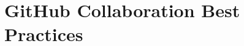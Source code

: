 \documentclass[12pt]{beamer}
\begin{document}
\begin{comment}
\begin{frame}{Git Commit}
  \begin{itemize}
    \item \textbf{Working Directory}: Your local project folder. Files here can be edited freely.
    \item \textbf{Staging Area (Index)}: A holding area for changes you want to include in the next commit.
    \item \textbf{Repository (Local)}: A database where Git permanently stores all versions of your project.
  \end{itemize}
  \vspace{1em}
  \begin{block}{Workflow}
    \texttt{working directory} $\rightarrow$ \texttt{staging area} $\rightarrow$ \texttt{repository}
  \end{block}
  \begin{itemize}
    \item Use \texttt{git add} to move changes to staging
    \item Use \texttt{git commit} to record changes to the repository
  \end{itemize}
\end{frame}

\begin{frame}{Essential Git Commands}
  \begin{itemize}
    \item \texttt{git init}
    \item \texttt{git status}
    \item \texttt{git add}
    \item \texttt{git commit}
    \item \texttt{git log}
    \item \texttt{git diff}
  \end{itemize}
\end{frame}
\end{comment}

\section{GitHub Collaboration Best Practices}
\end{document}

